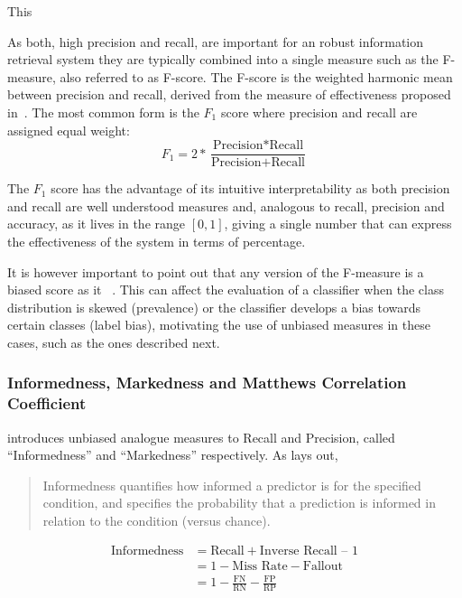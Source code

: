 This

As both, high precision and recall, are important for an robust information retrieval system they are typically combined into a single measure such as the F-measure, also referred to as F-score. The F-score is the weighted harmonic mean between precision and recall, derived from the measure of effectiveness proposed in~\cite{Rijsbergen:1979aa}. The most common form is the $F_1$ score  where precision and recall are assigned equal weight:
\begin{equation}
  \label{f1measure}
  F_1 = 2 * \frac{\text{Precision} * \text{Recall}}{\text{Precision} + \text{Recall}}
\end{equation}

The $F_1$ score has the advantage of its intuitive interpretability as both precision and recall are well understood measures and, analogous to recall, precision and accuracy, as it lives in the range $[0,1]$, giving a single number that can express the effectiveness of the system in terms of percentage.

It is however important to point out that any version of the F-measure is a biased score as it ~\cite{Powers:2011aa}. This can affect the evaluation of a classifier when the class distribution is skewed (prevalence) or the classifier develops a bias towards certain classes (label bias), motivating the use of unbiased measures in these cases, such as the ones described next.

\subsubsection{Informedness, Markedness and Matthews Correlation Coefficient}
\label{subs:informedness-markedness-mcc}

\cite{Powers:2011aa} introduces unbiased analogue measures to Recall and Precision, called ``Informedness'' and ``Markedness'' respectively. As \cite{Powers:2011aa} lays out, \blockquote{Informedness quantifies how informed a predictor is for the specified condition, and specifies the probability that a prediction is informed in relation to the condition (versus chance).}:

\begin{equation}
  \begin{split}
  \text{Informedness} &= \text{Recall} + \text{Inverse Recall} \text{ – } 1 \\
  &= 1 - \text{Miss Rate} - \text{Fallout} \\
  &= 1 - \frac{\text{FN}}{ \text{RN}} - \frac{\text{FP}}{\text{RP}}
  \end{split}
\end{equation}

